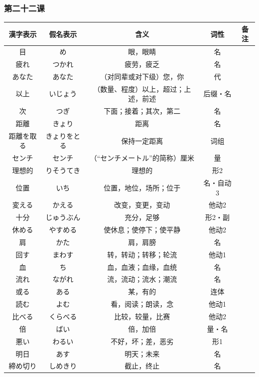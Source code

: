 \subsubsection{第二十二课}
\begin{longtable}{|c|c|c|c|c|}
    \hline
    漢字表示 & 假名表示  & 含义 & 词性 & 备注 \\ \hline\hline
    目 & め & 眼，眼睛 & 名 & \\ \hline
    疲れ & つかれ & 疲劳，疲乏 & 名 & \\ \hline
    あなた & あなた & （对同辈或对下级）您，你 & 代 & \\ \hline
    以上 & いじょう & （数量、程度）以上，超过；上述，前述 & 后缀・名 & \\ \hline
    次 & つぎ & 下面；接着；其次，第二 & 名 & \\ \hline
    距離 & きょり & 距离 & 名 & \\ \hline
    距離を取る & きょりをとる & 保持一定距离 & 词组 & \\ \hline
    センチ & センチ & （“センチメートル”的简称）厘米 & 量 & \\ \hline
    理想的 & りそうてき & 理想的 & 形2 & \\ \hline
    位置 & いち & 位置，地位，场所；位于 & 名・自动3 & \\ \hline
    変える & かえる & 改变，变更，变动 & 他动2 & \\ \hline
    十分 & じゅうぶん & 充分，足够 & 形2・副 & \\ \hline
    休める & やすめる & 使休息；使停下；使平静 & 他动2 & \\ \hline
    肩 & かた & 肩，肩膀 & 名 & \\ \hline
    回す & まわす & 转，转动；转移；轮流 & 他动1 & \\ \hline
    血 & ち & 血，血液；血缘，血统 & 名 & \\ \hline
    流れ & ながれ & 流，流动；流水；潮流 & 名 & \\ \hline
    或る & ある & 某，有的 & 连体 & \\ \hline
    読む & よむ & 看，阅读；朗读，念 & 他动1 & \\ \hline
    比べる & くらべる & 比较，较量，比赛 & 他动2 & \\ \hline
    倍 & ばい & 倍，加倍 & 量・名 & \\ \hline
    悪い & わるい & 不好，坏；差，恶劣 & 形1 & \\ \hline
    明日 & あす & 明天；未来 & 名 & \\ \hline
    締め切り & しめきり & 截止，终止 & 名 & \\ \hline

\end{longtable}
